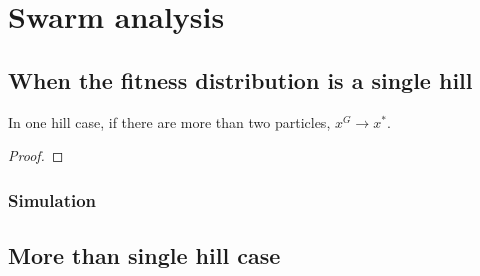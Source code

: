 \section{Swarm analysis}
\label{sec:swarm}




\subsection{When the fitness distribution is a single hill}

\begin{mythm}
In one hill case, if there are more than two particles, $ x^{G} \rightarrow x^{*} $.
\begin{proof}
\end{proof}
\end{mythm}

\subsubsection{Simulation}

\subsection{More than single hill case}

